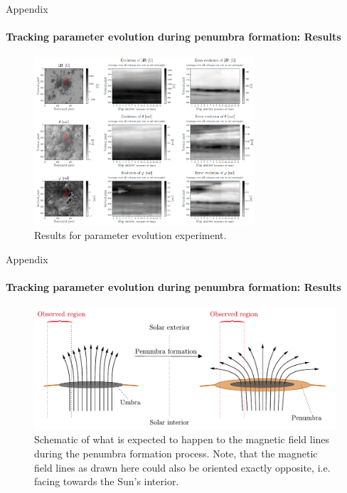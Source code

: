 \documentclass{beamer}
\begin{document}
\begin{frame}[allowframebreaks]{Appendix}
	\framesubtitle{Tracking parameter evolution during penumbra formation: Results} %
	\vspace{-0.5cm}
	\begin{figure}[h!]
		\centering
		\includegraphics[width=8.2cm]{figures/presentation/exp6_fig1.png}
		\caption{Results for parameter evolution experiment.}
		\label{fig:exp6_fig1}
	\end{figure}
\end{frame}

\begin{frame}[allowframebreaks]{Appendix}
	\framesubtitle{Tracking parameter evolution during penumbra formation: Results} %
	\begin{figure}[h!] %
		\centering
		\includegraphics[width=\textwidth]{figures/thesis/penumbraformation.pdf}
		\caption{Schematic of what is expected to happen to the magnetic field lines during the penumbra formation process. Note, that the magnetic field lines as drawn here could also be oriented exactly opposite, i.e. facing towards the Sun's interior.}
		\label{fig:penumbraformation}
	\end{figure}
\end{frame}
\end{document}
